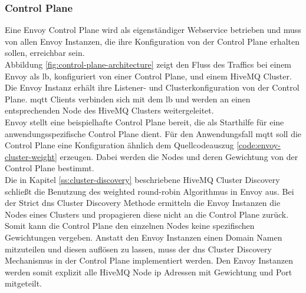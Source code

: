 \subsubsection{Control Plane} \label{ss:control-plane}
Eine Envoy Control Plane wird als eigenständiger Webservice betrieben und muss von allen Envoy Instanzen, die ihre Konfiguration von der Control Plane erhalten sollen, erreichbar sein.
\\
Abbildung \ref{fig:control-plane-architecture} zeigt den Fluss des Traffics bei einem Envoy als \acl{lb}, konfiguriert von einer Control Plane, und einem HiveMQ Cluster. Die Envoy Instanz erhält ihre Listener- und Clusterkonfiguration von der Control Plane. \ac{mqtt} Clients verbinden sich mit dem \ac{lb} und werden an einen entsprechenden Node des HiveMQ Clusters weitergeleitet.
\\
Envoy stellt eine beispielhafte Control Plane \cite{DynamicConfigurationControl} bereit, die als Starthilfe für eine anwendungsspezifische Control Plane dient. Für den Anwendungsfall \ac{mqtt} soll die Control Plane eine Konfiguration ähnlich dem Quellcodeauszug \ref{code:envoy-cluster-weight} erzeugen. Dabei werden die Nodes und deren Gewichtung von der Control Plane bestimmt.
\\
Die in Kapitel \ref{ss:cluster-discovery} beschriebene HiveMQ Cluster Discovery schlie{\ss}t die Benutzung des weighted round-robin Algorithmus in Envoy aus.
Bei der Strict \ac{dns} Cluster Discovery Methode ermitteln die Envoy Instanzen die Nodes eines Clusters und propagieren diese nicht an die Control Plane zurück. Somit kann die Control Plane den einzelnen Nodes keine spezifischen Gewichtungen vergeben.
Anstatt den Envoy Instanzen einen Domain Namen mitzuteilen und diesen auflösen zu lassen, muss der \ac{dns} Cluster Discovery Mechanismus in der Control Plane implementiert werden. Den Envoy Instanzen werden somit explizit alle HiveMQ Node \ac{ip} Adressen mit Gewichtung und Port mitgeteilt.
